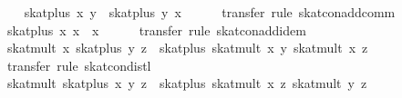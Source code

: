 \begin{isabellebody}
\ \ \isamarkupfalse%
\ {}skat{}plus\ x\ y\ {}\ skat{}plus\ y\ x{}\isanewline
\ \ \ \ \isamarkupfalse%
\ {}transfer{}\ rule\ skat{}con{}add{}comm{}\isanewline
\ \ \isamarkupfalse%
\ {}skat{}plus\ x\ x\ {}\ x{}\isanewline
\ \ \ \ \isamarkupfalse%
\ {}transfer{}\ rule\ skat{}con{}add{}idem{}\isanewline
\ \ \isamarkupfalse%
\ {}skat{}mult\ x\ {}skat{}plus\ y\ z{}\ {}\ skat{}plus\ {}skat{}mult\ x\ y{}\ {}skat{}mult\ x\ z{}{}\isanewline
\ \ \ \ \isamarkupfalse%
\ {}transfer{}\ rule\ skat{}con{}distl{}\isanewline
\ \ \isamarkupfalse%
\ {}skat{}mult\ {}skat{}plus\ x\ y{}\ z\ {}\ skat{}plus\ {}skat{}mult\ x\ z{}\ {}skat{}mult\ y\ z{}{}\isanewline

\end{isabellebody}
